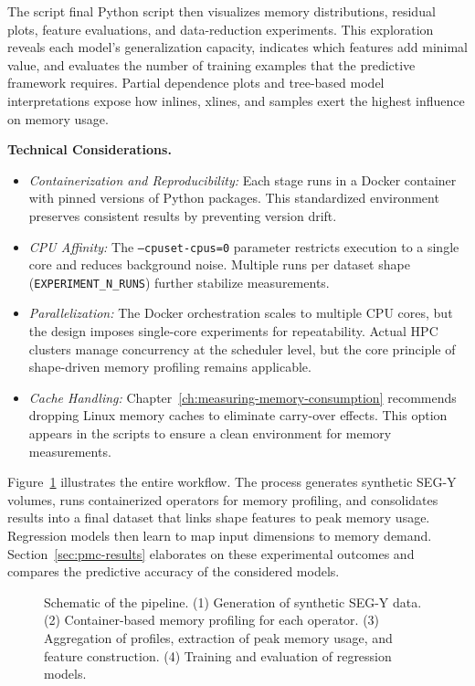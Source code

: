 The script final Python script then visualizes memory distributions, residual plots, feature evaluations, and data-reduction experiments.
This exploration reveals each model’s generalization capacity, indicates which features add minimal value, and evaluates the number of training examples that the predictive framework requires.
Partial dependence plots and tree-based model interpretations expose how inlines, xlines, and samples exert the highest influence on memory usage.

\vspace{1em}
\noindent
\textbf{Technical Considerations.}
\begin{itemize}
    \item \emph{Containerization and Reproducibility:}
    Each stage runs in a Docker container with pinned versions of Python packages.
    This standardized environment preserves consistent results by preventing version drift.
    \item \emph{\ac{CPU} Affinity:}
    The \texttt{--cpuset-cpus=0} parameter restricts execution to a single core and reduces background noise.
    Multiple runs per dataset shape (\texttt{EXPERIMENT\_N\_RUNS}) further stabilize measurements.
    \item \emph{Parallelization:}
    The Docker orchestration scales to multiple \ac{CPU} cores, but the design imposes single-core experiments for repeatability.
    Actual \ac{HPC} clusters manage concurrency at the scheduler level, but the core principle of shape-driven memory profiling remains applicable.
    \item \emph{Cache Handling:}
    Chapter~\ref{ch:measuring-memory-consumption} recommends dropping Linux memory caches to eliminate carry-over effects.
    This option appears in the scripts to ensure a clean environment for memory measurements.
\end{itemize}

\vspace{1em}
\noindent
Figure~\ref{fig:pmc_datapipeline} illustrates the entire workflow.
The process generates synthetic \ac{SEG-Y} volumes, runs containerized operators for memory profiling, and consolidates results into a final dataset that links shape features to peak memory usage.
Regression models then learn to map input dimensions to memory demand.
Section~\ref{sec:pmc-results} elaborates on these experimental outcomes and compares the predictive accuracy of the considered models.

\begin{figure}[htbp]
    \centering
    \fbox{\rule{0pt}{1in}\rule{.9\linewidth}{0pt}}
    \caption{Schematic of the pipeline.
        (1) Generation of synthetic \ac{SEG-Y} data.
        (2) Container-based memory profiling for each operator.
        (3) Aggregation of profiles, extraction of peak memory usage, and feature construction.
        (4) Training and evaluation of regression models.}
    \label{fig:pmc_datapipeline}
\end{figure}